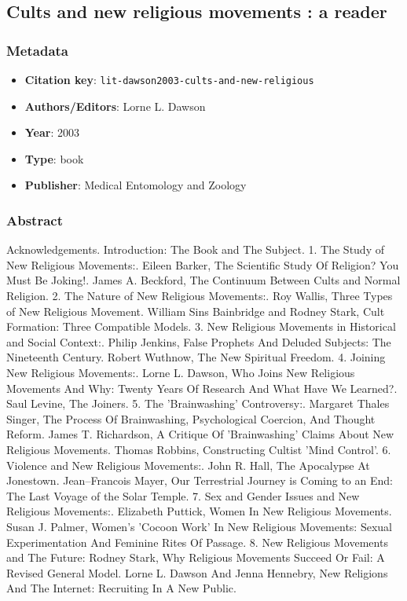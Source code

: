 \subsection{Cults and new religious movements : a reader}\label{lit:lit-dawson2003-cults-and-new-religious}
\subsubsection*{Metadata}
\begin{itemize}
  \item \textbf{Citation key}: \texttt{lit-dawson2003-cults-and-new-religious}
  \item \textbf{Authors/Editors}: Lorne L. Dawson
  \item \textbf{Year}: 2003
  \item \textbf{Type}: book
  \item \textbf{Publisher}: Medical Entomology and Zoology
\end{itemize}
\subsubsection*{Abstract}
Acknowledgements. Introduction: The Book and The Subject. 1. The Study of New Religious Movements:. Eileen Barker, The Scientific Study Of Religion? You Must Be Joking!. James A. Beckford, The Continuum Between Cults and Normal Religion. 2. The Nature of New Religious Movements:. Roy Wallis, Three Types of New Religious Movement. William Sins Bainbridge and Rodney Stark, Cult Formation: Three Compatible Models. 3. New Religious Movements in Historical and Social Context:. Philip Jenkins, False Prophets And Deluded Subjects: The Nineteenth Century. Robert Wuthnow, The New Spiritual Freedom. 4. Joining New Religious Movements:. Lorne L. Dawson, Who Joins New Religious Movements And Why: Twenty Years Of Research And What Have We Learned?. Saul Levine, The Joiners. 5. The 'Brainwashing' Controversy:. Margaret Thales Singer, The Process Of Brainwashing, Psychological Coercion, And Thought Reform. James T. Richardson, A Critique Of 'Brainwashing' Claims About New Religious Movements. Thomas Robbins, Constructing Cultist 'Mind Control'. 6. Violence and New Religious Movements:. John R. Hall, The Apocalypse At Jonestown. Jean--Francois Mayer, Our Terrestrial Journey is Coming to an End: The Last Voyage of the Solar Temple. 7. Sex and Gender Issues and New Religious Movements:. Elizabeth Puttick, Women In New Religious Movements. Susan J. Palmer, Women's 'Cocoon Work' In New Religious Movements: Sexual Experimentation And Feminine Rites Of Passage. 8. New Religious Movements and The Future: Rodney Stark, Why Religious Movements Succeed Or Fail: A Revised General Model. Lorne L. Dawson And Jenna Hennebry, New Religions And The Internet: Recruiting In A New Public.


